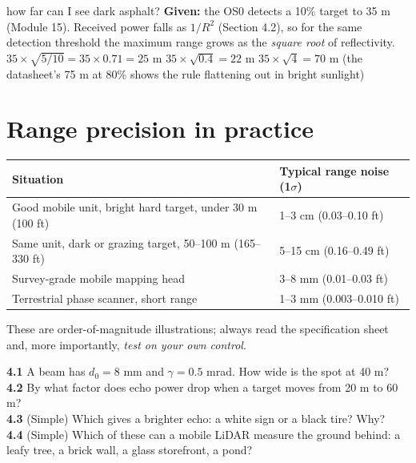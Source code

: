 \begin{worked}{how far can I see dark asphalt?}
\textbf{Given:} the OS0 detects a 10\% target to 35 m (Module 15). Received power falls as $1/R^2$ (Section 4.2), so for the same detection threshold the maximum range grows as the \emph{square root} of reflectivity.
 $35\times\sqrt{5/10}=35\times0.71=25$ m
 $35\times\sqrt{0.4}=22$ m
 $35\times\sqrt{4}=70$ m (the datasheet's 75 m at 80\% shows the rule flattening out in bright sunlight)
\end{worked}

\section{Range precision in practice}
\begin{center}\small
\renewcommand{\arraystretch}{1.2}
\begin{tabularx}{\linewidth}{Xl}\toprule
\textbf{Situation} & \textbf{Typical range noise (1$\sigma$)}\\\midrule
Good mobile unit, bright hard target, under 30 m (100 ft) & 1--3 cm (0.03--0.10 ft)\\
Same unit, dark or grazing target, 50--100 m (165--330 ft) & 5--15 cm (0.16--0.49 ft)\\
Survey-grade mobile mapping head & 3--8 mm (0.01--0.03 ft)\\
Terrestrial phase scanner, short range & 1--3 mm (0.003--0.010 ft)\\\bottomrule
\end{tabularx}\end{center}
These are order-of-magnitude illustrations; always read the specification sheet and, more importantly, \emph{test on your own control}.

\begin{tryit}
\textbf{4.1} A beam has $d_0=8$ mm and $\gamma=0.5$ mrad. How wide is the spot at 40 m?\\
\textbf{4.2} By what factor does echo power drop when a target moves from 20 m to 60 m?\\
\textbf{4.3} (Simple) Which gives a brighter echo: a white sign or a black tire? Why?\\
\textbf{4.4} (Simple) Which of these can a mobile LiDAR measure the ground behind: a leafy tree, a brick wall, a glass storefront, a pond?
\end{tryit}


